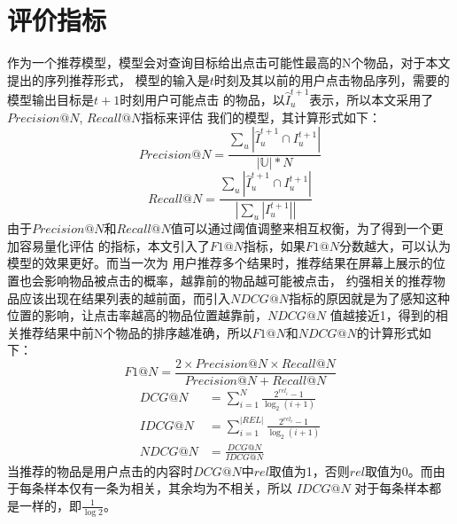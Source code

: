 \section{评价指标}
作为一个推荐模型，模型会对查询目标给出点击可能性最高的N个物品，对于本文提出的序列推荐形式，%
模型的输入是$t$时刻及其以前的用户点击物品序列，需要的模型输出目标是$t+1$时刻用户可能点击%
的物品，以$\hat{I}_{u}^{t+1}$表示，所以本文采用了$Precision@N$, $Recall@N$指标来评估%
我们的模型，其计算形式如下：
\begin{equation}
Precision@N=\frac{\sum_{u}|\hat{I}_{u}^{t+1}\cap I_{u}^{t+1} |}{\left | \mathbb{U} \right |*N}
\end{equation}
\begin{equation}
Recall@N=\frac{\sum_{u}|\hat{I}_{u}^{t+1}\cap I_{u}^{t+1} |}{\left |\sum_{u}|I_{u}^{t+1}| \right |}
\end{equation}
由于$Precision@N$和$Recall@N$值可以通过阈值调整来相互权衡，为了得到一个更加容易量化评估%
的指标，本文引入了$F1@N$指标，如果$F1@N$分数越大，可以认为模型的效果更好。而当一次为%
用户推荐多个结果时，推荐结果在屏幕上展示的位置也会影响物品被点击的概率，越靠前的物品越可能被点击，%
约强相关的推荐物品应该出现在结果列表的越前面，而引入$NDCG@N$指标的原因就是为了感知这种%
位置的影响，让点击率越高的物品位置越靠前，$NDCG@N$%
值越接近1，得到的相关推荐结果中前N个物品的排序越准确，所以$F1@N$和$NDCG@N$的计算形式如下：
\begin{equation}
F1@N=\frac{2\times Precision@N\times Recall@N}{Precision@N+Recall@N}
\end{equation}
\begin{equation}
  \begin{aligned}
  DCG@N &= \sum_{i=1}^{N} \frac{2^{rel_{i}}-1}{\log _{2}(i+1)} \\
  IDCG@N &= \sum_{i=1}^{|REL|} \frac{2^{rel_{i}}-1}{\log _{2}(i+1)} \\
  NDCG@N &= \frac{DCG@N}{IDCG@N}
  \label{E21}
  \end{aligned}
\end{equation}
当推荐的物品是用户点击的内容时$DCG@N$中$rel$取值为1，否则$rel$取值为0。而由于每条样本仅有一条为相关，其余均为不相关，所以 $IDCG@N$ 对于每条样本都是一样的，即$\frac{1}{\log 2}$。

